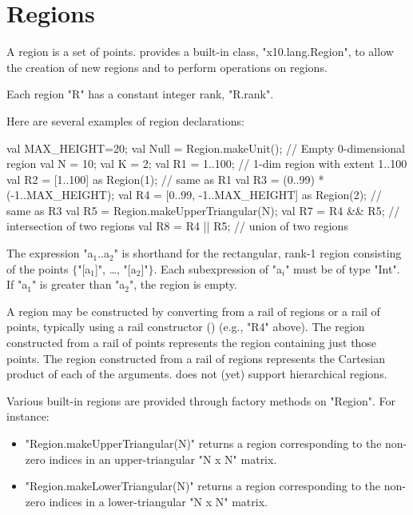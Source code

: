 \section{Regions}\label{XtenRegions}

A region is a set of points.  {}\Xten{}
provides a built-in class, \xcd"x10.lang.Region", to allow the
creation of new regions and to perform operations on regions. 

Each region \xcd"R" has a constant integer rank, \xcd"R.rank".

Here are several examples of region declarations:
\begin{xten}
val MAX_HEIGHT=20;
val Null = Region.makeUnit();  // Empty 0-dimensional region          
val N = 10;
val K = 2;
val R1 = 1..100; // 1-dim region with extent 1..100
val R2 = [1..100] as Region(1); // same as R1
val R3 = (0..99) * (-1..MAX_HEIGHT);   
val R4 = [0..99, -1..MAX_HEIGHT] as Region(2); // same as R3  
val R5 = Region.makeUpperTriangular(N);
val R7 = R4 && R5; // intersection of two regions
val R8 = R4 || R5; // union of two regions
\end{xten}

The expression \xcdmath"a$_1$..a$_2$"
is shorthand for the rectangular, rank-1 region
consisting of the points
$\{$\xcdmath"[a$_1$]", \dots, \xcdmath"[a$_2$]"$\}$.
Each subexpression of \xcdmath"a$_i$" must be of type \xcd"Int".
If \xcdmath"a$_1$"
is greater than \xcdmath"a$_2$", the region is empty.

A region may be constructed by converting from a rail of
regions or a rail of points, typically using a rail constructor
()
(e.g., \xcd"R4" above).
The region constructed from a rail of points represents the
region containing just those points.
The region constructed from a rail of regions
represents
the Cartesian product of each of the arguments.
\XtenCurrVer{} does not (yet) support hierarchical regions.


Various built-in regions are provided through  factory
methods on \xcd"Region".  For instance:
\begin{itemize}
\item \xcd"Region.makeUpperTriangular(N)" returns a region corresponding
to the non-zero indices in an upper-triangular \xcd"N x N" matrix.
\item \xcd"Region.makeLowerTriangular(N)" returns a region corresponding
to the non-zero indices in a lower-triangular \xcd"N x N" matrix.
\end{itemize}

